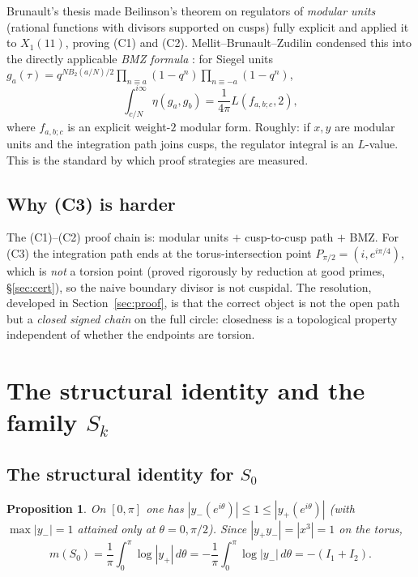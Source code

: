 \documentclass[11pt]{amsart}
\newtheorem{proposition}[theorem]{Proposition}
\theoremstyle{definition}
\theoremstyle{remark}
\begin{document}
Brunault's thesis \cite{Brunault} made Beilinson's theorem on regulators of
\emph{modular units} (rational functions with divisors supported on cusps)
fully explicit and applied it to $X_1(11)$, proving (C1) and (C2).
Mellit--Brunault--Zudilin condensed this into the directly applicable
\emph{BMZ formula} \cite{Zudilin}: for Siegel units
$g_a(\tau)=q^{NB_2(a/N)/2}\prod_{n\equiv a}(1-q^n)\prod_{n\equiv -a}(1-q^n)$,
\[
  \int_{c/N}^{i\infty}\eta(g_a,g_b)=\frac1{4\pi}L(f_{a,b;c},2),
\]
where $f_{a,b;c}$ is an explicit weight-$2$ modular form. Roughly: if $x,y$
are modular units and the integration path joins cusps, the regulator
integral is an $L$-value. This is the standard by which proof strategies are
measured.

\subsection{Why (C3) is harder}

The (C1)--(C2) proof chain is: modular units $+$ cusp-to-cusp path $+$ BMZ.
For (C3) the integration path ends at the torus-intersection point
$P_{\pi/2}=(i,e^{i\pi/4})$, which is \emph{not} a torsion point (proved
rigorously by reduction at good primes, \S\ref{sec:cert}), so the naive
boundary divisor is not cuspidal. The resolution, developed in
Section~\ref{sec:proof}, is that the correct object is not the open path but
a \emph{closed signed chain} on the full circle: closedness is a topological
property independent of whether the endpoints are torsion.

\section{The structural identity and the family \texorpdfstring{$S_k$}{Sk}}
\label{sec:family}

\subsection{The structural identity for \texorpdfstring{$S_0$}{S0}}

\begin{proposition}\label{prop:structural}
On $[0,\pi]$ one has $|y_-(e^{i\theta})|\le 1\le |y_+(e^{i\theta})|$
(with $\max|y_-|=1$ attained only at $\theta=0,\pi/2$). Since
$|y_+y_-|=|x^3|=1$ on the torus,
\[
  m(S_0)=\frac1\pi\int_0^\pi\log|y_+|\,d\theta
  =-\frac1\pi\int_0^\pi\log|y_-|\,d\theta=-(I_1+I_2).
\]
\end{proposition}
\end{document}

